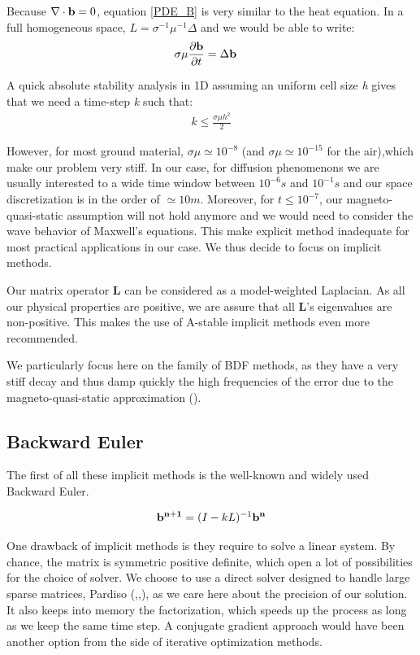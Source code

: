 \documentclass[twoside]{article}
\begin{document}
Because $\nabla \cdot {\bf b}=0$, equation \ref{PDE_B} is very similar to the heat equation. In a full homogeneous space, $L=\sigma^{-1}\mu^{-1} \Delta$ and we would be able to write:
\begin{align}
\sigma \mu \frac{ \partial {\bf b}}{\partial t} & = \Delta {\bf b}
\end{align}

A quick absolute stability analysis in 1D assuming an uniform cell size \textit{h} gives that we need a time-step \textit{k} such that:
\begin{align}
k \leq \frac{\sigma \mu h^2}{2}
\end{align}

However, for most ground material, $\sigma \mu \simeq 10^{-8}$ (and $\sigma \mu \simeq 10^{-15}$ for the air),which make our problem very stiff. In our case, for diffusion phenomenons we are usually interested to a wide time window between $10^{-6}s$ and $10^{-1}s$ and our space discretization is in the order of $\simeq10m$. Moreover, for $t\leq10^{-7}$, our magneto-quasi-static assumption will not hold anymore and we would need to consider the wave behavior of Maxwell's equations. This make explicit method inadequate for most practical applications in our case. We thus decide to focus on implicit methods.

Our matrix operator \textbf{L} can be considered as a model-weighted Laplacian. As all our physical properties are positive, we are assure that all \textbf{L}'s eigenvalues are non-positive. This makes the use of A-stable implicit methods even more recommended.

We particularly focus here on the family of BDF methods, as they have a very stiff decay and thus damp quickly the high frequencies of the error due to the magneto-quasi-static approximation (\cite{HAO:2004}).

\subsection{Backward Euler}
The first of all these implicit methods is the well-known and widely used Backward Euler.

\begin{align}
{\bf b^{n+1}} = (I-kL)^{-1}{\bf b^n}
\end{align}

One drawback of implicit methods is they require to solve a linear system. By chance, the matrix is symmetric positive definite, which open a lot of possibilities for the choice of solver. We choose to use a direct solver designed to handle large sparse matrices, Pardiso (\cite{Pardiso1},\cite{Pardiso2},\cite{Pardiso3}), as we care here about the precision of our solution. It also keeps into memory the factorization, which speeds up the process as long as we keep the same time step. A conjugate gradient approach would have been another option from the side of iterative optimization methods.
\end{document}
